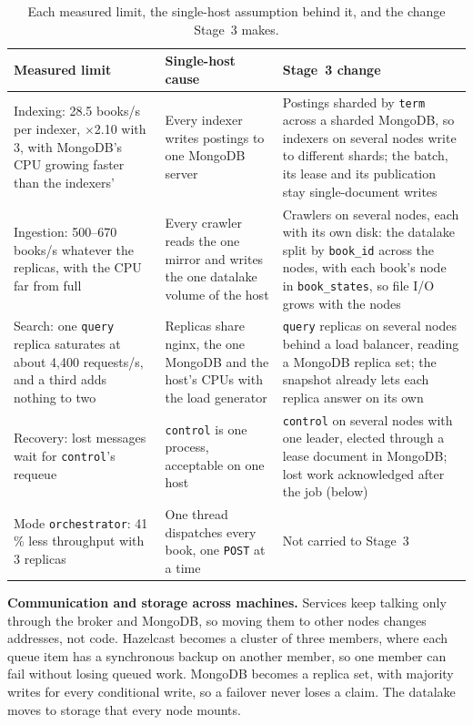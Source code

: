\documentclass[11pt,a4paper]{article}
\newcommand{\code}[1]{\nolinkurl{#1}}
\newcommand{\mode}[1]{\code{#1}}
\begin{document}
\begin{table}[ht]
\centering
\small
\caption{Each measured limit, the single-host assumption behind it, and the change Stage~3 makes.}
\label{tab:stage3}
\begin{tabularx}{\textwidth}{@{}L{4.0cm}L{4.1cm}Y@{}}
\toprule
Measured limit & Single-host cause & Stage~3 change \\
\midrule
Indexing: 28.5 books/s per indexer, $\times$2.10 with 3, with MongoDB's CPU growing faster than the indexers' & Every indexer writes postings to one MongoDB server & Postings sharded by \code{term} across a sharded MongoDB, so indexers on several nodes write to different shards; the batch, its lease and its publication stay single-document writes \\
Ingestion: 500--670 books/s whatever the replicas, with the CPU far from full & Every crawler reads the one mirror and writes the one datalake volume of the host & Crawlers on several nodes, each with its own disk: the datalake split by \code{book_id} across the nodes, with each book's node in \code{book_states}, so file I/O grows with the nodes \\
Search: one \code{query} replica saturates at about 4{,}400 requests/s, and a third adds nothing to two & Replicas share nginx, the one MongoDB and the host's CPUs with the load generator & \code{query} replicas on several nodes behind a load balancer, reading a MongoDB replica set; the snapshot already lets each replica answer on its own \\
Recovery: lost messages wait for \code{control}'s requeue & \code{control} is one process, acceptable on one host & \code{control} on several nodes with one leader, elected through a lease document in MongoDB; lost work acknowledged after the job (below) \\
Mode \mode{orchestrator}: 41\,\% less throughput with 3 replicas & One thread dispatches every book, one \code{POST} at a time & Not carried to Stage~3 \\
\bottomrule
\end{tabularx}
\end{table}

\textbf{Communication and storage across machines.} Services keep talking only through the broker and MongoDB, so
moving them to other nodes changes addresses, not code. Hazelcast becomes a cluster of three members, where each queue
item has a synchronous backup on another member, so one member can fail without losing queued work. MongoDB becomes a
replica set, with majority writes for every conditional write, so a failover never loses a claim. The datalake moves to
storage that every node mounts.
\end{document}
